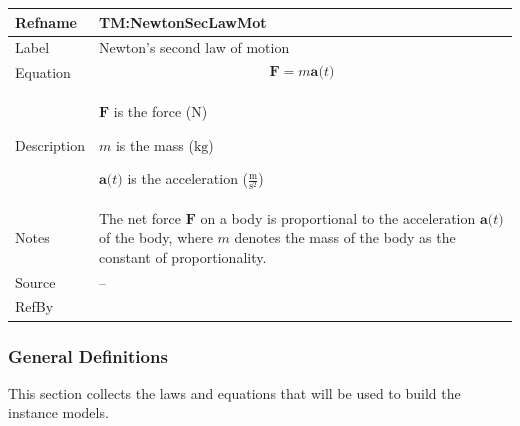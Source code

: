 \documentclass[12pt]{article}
\begin{document}
\vspace{\baselineskip}
\noindent
\begin{minipage}{\textwidth}
\begin{tabular}{>{\raggedright}p{}>{\raggedright\arraybackslash}p{}}
\toprule \textbf{Refname} & \textbf{TM:NewtonSecLawMot}
\label{TM:NewtonSecLawMot}
\\ \midrule
Label & Newton's second law of motion
        
\\ \midrule
Equation & \begin{displaymath}
           \symbf{F}=m \symbf{a}\text{(}t\text{)}
           \end{displaymath}
\\ \midrule
Description & \begin{symbDescription}
              \item{$\symbf{F}$ is the force (${\text{N}}$)}
              \item{$m$ is the mass (${\text{kg}}$)}
              \item{$\symbf{a}\text{(}t\text{)}$ is the acceleration ($\frac{\text{m}}{\text{s}^{2}}$)}
              \end{symbDescription}
\\ \midrule
Notes & The net force $\symbf{F}$ on a body is proportional to the acceleration $\symbf{a}\text{(}t\text{)}$ of the body, where $m$ denotes the mass of the body as the constant of proportionality.
        
\\ \midrule
Source & --
         
\\ \midrule
RefBy & 
\\ \bottomrule
\end{tabular}
\end{minipage}

\subsubsection{General Definitions}
\label{Sec:GDs}
This section collects the laws and equations that will be used to build the instance models.
\end{document}
